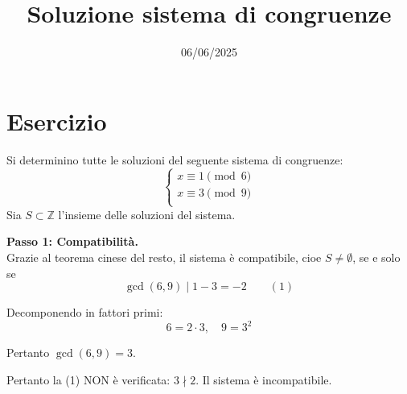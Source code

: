 \documentclass[12pt]{article}
\begin{document}
\title{Soluzione sistema di congruenze}
\date{06/06/2025}
\maketitle
\section*{Esercizio}
Si determinino tutte le soluzioni del seguente sistema di congruenze:
\[
\begin{cases}
x \equiv 1 \pmod{6} \\
x \equiv 3 \pmod{9} \\
\end{cases}
\]
Sia $S \subset \mathbb{Z}$ l'insieme delle soluzioni del sistema.

\textbf{Passo 1: Compatibilità.} \\ 
Grazie al teorema cinese del resto, il sistema è compatibile, cioe $S \neq \emptyset$, se e solo se
$$\gcd(6, 9) \mid 1 - 3 = -2 \qquad (1)$$

Decomponendo in fattori primi:
$$6 = 2 \cdot 3, \quad 9 = 3^{2}$$

Pertanto $\gcd(6, 9) = 3$.

Pertanto la (1) NON è verificata: $3 \nmid 2$. Il sistema è incompatibile.\\
\end{document}

